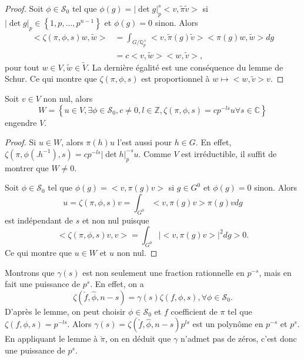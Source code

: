 \begin{proof}
Soit $\phi \in \mathcal{S}_0$ tel que $\phi(g) = |\det g|_p^s<v, \tilde{\pi}\tilde{v}>$ si $|\det g|_p \in \left\lbrace 1, p, ..., p^{n-1} \right\rbrace$ et $\phi(g) = 0$ sinon. Alors
\begin{align}
<\zeta(\pi,\phi,s)w,\tilde{w}> &= \int_{G/\mathbb{Q}_p^\times} <v,\tilde{\pi}(g)\tilde{v}><\pi(g)w,\tilde{w}>dg \\
&= c <v, \tilde{w}><w,\tilde{v}>,
\end{align}
pour tout $w \in V, \tilde{w} \in \tilde{V}$. La dernière égalité est une conséquence du lemme de Schur. Ce qui montre que $\zeta(\pi, \phi,s)$ est proportionnel à $w \mapsto <w,\tilde{v}>v$.
\end{proof}

\begin{lemme}
Soit $v \in V$ non nul, alors
$$W=\left\lbrace u \in V, \exists \phi \in \mathcal{S}_0, c \neq 0, l \in \mathbb{Z}, \zeta(\pi, \phi, s) = cp^{-ls}u \forall s \in \mathbb{C} \right\rbrace$$
engendre $V$.
\end{lemme}

\begin{proof}
Si $u \in W$, alors $\pi(h)u$ l'est aussi pour $h \in G$. En effet,
$\zeta(\pi,\phi(.h^{-1}),s) = cp^{-ls}|\det h|_p^{-s}u$. Comme $V$ est irréductible, il suffit de montrer que $W \neq 0$.

Soit $\phi \in \mathcal{S}_0$ tel que $\phi(g) = <v, \pi(g)v>$ si $g \in G^0$ et $\phi(g) = 0$ sinon. Alors
\begin{equation}
u=\zeta(\pi, \phi, s)v = \int_{G^0} <v,\pi(g)v>\pi(g)v dg
\end{equation}
est indépendant de $s$ et non nul puisque
\begin{equation}
<\zeta(\pi,\phi,s)v,v> = \int_{G^0} |<v,\pi(g)v>|^2 dg > 0.
\end{equation}
Ce qui montre que $u \in W$ et $u$ non nul.
\end{proof}

Montrons que $\gamma(s)$ est non seulement une fraction rationnelle en $p^{-s}$, mais en fait une puissance de $p^s$. En effet, on a
\begin{equation}
\zeta(\check{f}, \hat{\phi}, n-s)=\gamma(s)\zeta(f,\phi,s), \forall \phi \in \mathcal{S}_0.
\end{equation}
D'après le lemme, on peut choisir $\phi \in \mathcal{S}_0$ et $f$ coefficient de $\pi$ tel que $\zeta(f,\phi,s)=p^{-ls}$. Alors $\gamma(s) = \zeta(\check{f}, \hat{\phi}, n-s)p^{ls}$ est un polynôme en $p^{-s}$ et $p^s$. En appliquant le lemme à $\check{\pi}$, on en déduit que $\gamma$ n'admet pas de zéros, c'est donc une puissance de $p^{s}$.

